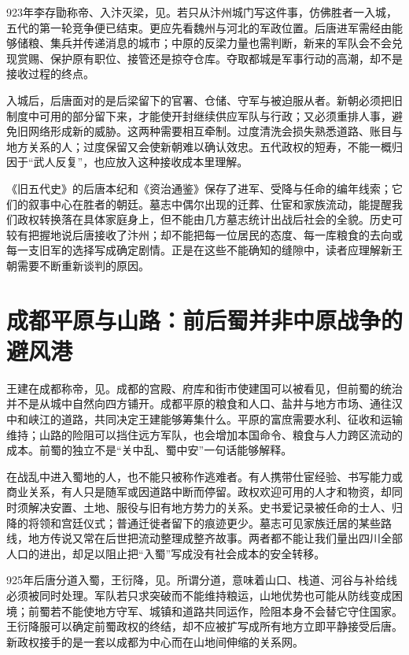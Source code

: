 923年李存勖称帝、入汴灭梁，见。若只从汴州城门写这件事，仿佛胜者一入城，五代的第一轮竞争便已结束。更应先看魏州与河北的军政位置。后唐进军需经由能够储粮、集兵并传递消息的城市；中原的反梁力量也需判断，新来的军队会不会兑现赏赐、保护原有职位、接管还是掠夺仓库。夺取都城是军事行动的高潮，却不是接收过程的终点。

入城后，后唐面对的是后梁留下的官署、仓储、守军与被迫服从者。新朝必须把旧制度中可用的部分留下来，才能使开封继续供应军队与行政；又必须重排人事，避免旧网络形成新的威胁。这两种需要相互牵制。过度清洗会损失熟悉道路、账目与地方关系的人；过度保留又会使新朝难以确认效忠。五代政权的短寿，不能一概归因于“武人反复”，也应放入这种接收成本里理解。

《旧五代史》的后唐本纪和《资治通鉴》保存了进军、受降与任命的编年线索；它们的叙事中心在胜者的朝廷。墓志中偶尔出现的迁葬、仕宦和家族流动，能提醒我们政权转换落在具体家庭身上，但不能由几方墓志统计出战后社会的全貌。历史可较有把握地说后唐接收了汴州；却不能把每一位居民的态度、每一库粮食的去向或每一支旧军的选择写成确定剧情。正是在这些不能确知的缝隙中，读者应理解新王朝需要不断重新谈判的原因。

\section{成都平原与山路：前后蜀并非中原战争的避风港}

王建在成都称帝，见。成都的宫殿、府库和街市使建国可以被看见，但前蜀的统治并不是从城中自然向四方铺开。成都平原的粮食和人口、盐井与地方市场、通往汉中和峡江的道路，共同决定王建能够筹集什么。平原的富庶需要水利、征收和运输维持；山路的险阻可以挡住远方军队，也会增加本国命令、粮食与人力跨区流动的成本。前蜀的独立不是“关中乱、蜀中安”一句话能够解释。

在战乱中进入蜀地的人，也不能只被称作逃难者。有人携带仕宦经验、书写能力或商业关系，有人只是随军或因道路中断而停留。政权欢迎可用的人才和物资，却同时须解决安置、土地、服役与旧有地方势力的关系。史书爱记录被任命的士人、归降的将领和宫廷仪式；普通迁徙者留下的痕迹更少。墓志可见家族迁居的某些路线，地方传说又常在后世把流动整理成整齐故事。两者都不能让我们量出四川全部人口的进出，却足以阻止把“入蜀”写成没有社会成本的安全转移。

925年后唐分道入蜀，王衍降，见。所谓分道，意味着山口、栈道、河谷与补给线必须被同时处理。军队若只求突破而不能维持粮运，山地优势也可能从防线变成困境；前蜀若不能使地方守军、城镇和道路共同运作，险阻本身不会替它守住国家。王衍降服可以确定前蜀政权的终结，却不应被扩写成所有地方立即平静接受后唐。新政权接手的是一套以成都为中心而在山地间伸缩的关系网。

